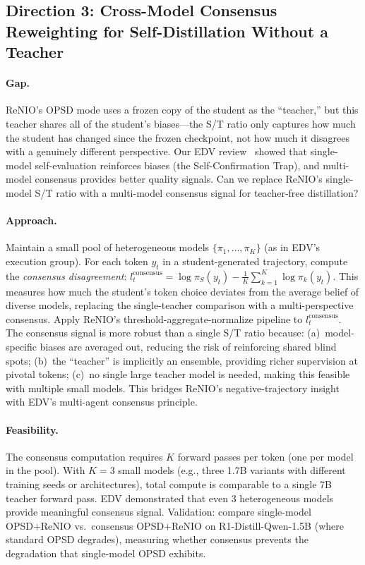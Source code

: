 \documentclass[11pt,a4paper]{article}
\begin{document}
\subsection{Direction 3: Cross-Model Consensus Reweighting for Self-Distillation Without a Teacher}

\paragraph{Gap.} ReNIO's OPSD mode uses a frozen copy of the student as the ``teacher,'' but this teacher shares all of the student's biases---the S/T ratio only captures how much the student has changed since the frozen checkpoint, not how much it disagrees with a genuinely different perspective. Our EDV review~\cite{zhu2026edv} showed that single-model self-evaluation reinforces biases (the Self-Confirmation Trap), and multi-model consensus provides better quality signals. Can we replace ReNIO's single-model S/T ratio with a multi-model consensus signal for teacher-free distillation?

\paragraph{Approach.} Maintain a small pool of heterogeneous models $\{\pi_1, \ldots, \pi_K\}$ (as in EDV's execution group). For each token $y_t$ in a student-generated trajectory, compute the \emph{consensus disagreement}: $l_t^{\mathrm{consensus}} = \log \pi_S(y_t) - \frac{1}{K}\sum_{k=1}^K \log \pi_k(y_t)$. This measures how much the student's token choice deviates from the average belief of diverse models, replacing the single-teacher comparison with a multi-perspective consensus. Apply ReNIO's threshold-aggregate-normalize pipeline to $l_t^{\mathrm{consensus}}$. The consensus signal is more robust than a single S/T ratio because: (a)~model-specific biases are averaged out, reducing the risk of reinforcing shared blind spots; (b)~the ``teacher'' is implicitly an ensemble, providing richer supervision at pivotal tokens; (c)~no single large teacher model is needed, making this feasible with multiple small models. This bridges ReNIO's negative-trajectory insight with EDV's multi-agent consensus principle.

\paragraph{Feasibility.} The consensus computation requires $K$ forward passes per token (one per model in the pool). With $K=3$ small models (e.g., three 1.7B variants with different training seeds or architectures), total compute is comparable to a single 7B teacher forward pass. EDV demonstrated that even 3 heterogeneous models provide meaningful consensus signal. Validation: compare single-model OPSD+ReNIO vs.\ consensus OPSD+ReNIO on R1-Distill-Qwen-1.5B (where standard OPSD degrades), measuring whether consensus prevents the degradation that single-model OPSD exhibits.
\end{document}
